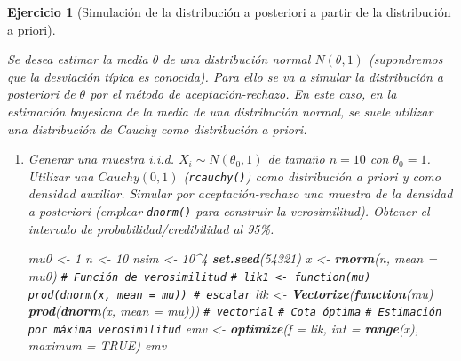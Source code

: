 \documentclass[
  spanish,
  10pt,
]{book}
\newenvironment{Shaded}{\begin{snugshade}}{\end{snugshade}}
\newcommand{\AttributeTok}[1]{\textcolor[rgb]{0.13,0.29,0.53}{#1}}
\newcommand{\CommentTok}[1]{\textcolor[rgb]{0.56,0.35,0.01}{\textit{#1}}}
\newcommand{\ConstantTok}[1]{\textcolor[rgb]{0.56,0.35,0.01}{#1}}
\newcommand{\ControlFlowTok}[1]{\textcolor[rgb]{0.13,0.29,0.53}{\textbf{#1}}}
\newcommand{\DecValTok}[1]{\textcolor[rgb]{0.00,0.00,0.81}{#1}}
\newcommand{\FunctionTok}[1]{\textcolor[rgb]{0.13,0.29,0.53}{\textbf{#1}}}
\newcommand{\NormalTok}[1]{#1}
\newcommand{\OtherTok}[1]{\textcolor[rgb]{0.56,0.35,0.01}{#1}}
\newcommand{\SpecialCharTok}[1]{\textcolor[rgb]{0.81,0.36,0.00}{\textbf{#1}}}
\theoremstyle{break}
\newtheorem{exercise}{Ejercicio}[chapter]
\theoremstyle{nonumberplain}
\renewcommand{\CommentTok}[1]{\textcolor[rgb]{0.41,0.41,0.41}{\texttt{#1}}}
\begin{document}
\begin{exercise}[Simulación de la distribución a posteriori a partir de la distribución a priori]
\protect\hypertarget{exr:post-pri-ar}{}\label{exr:post-pri-ar}

Se desea estimar la media \(\theta\) de una distribución normal \(N(\theta, 1)\) (supondremos que la desviación típica es conocida).
Para ello se va a simular la distribución a posteriori de \(\theta\) por el método de aceptación-rechazo.
En este caso, en la estimación bayesiana de la media de una distribución normal, se suele utilizar una distribución de Cauchy como distribución a priori.

\begin{enumerate}
\def\labelenumi{\alph{enumi})}
\item
  Generar una muestra i.i.d. \(X_{i}\sim N(\theta_{0},1)\) de tamaño
  \(n=10\) con \(\theta_{0}=1\). Utilizar una \(Cauchy(0,1)\)
  (\texttt{rcauchy()}) como distribución a priori y como densidad auxiliar.
  Simular por aceptación-rechazo una muestra de la densidad a
  posteriori (emplear \texttt{dnorm()} para construir la verosimilitud).
  Obtener el intervalo de probabilidad/credibilidad al 95\%.

\begin{Shaded}
\begin{Highlighting}[]
\NormalTok{mu0 }\OtherTok{\textless{}{-}} \DecValTok{1}
\NormalTok{n }\OtherTok{\textless{}{-}} \DecValTok{10}
\NormalTok{nsim }\OtherTok{\textless{}{-}} \DecValTok{10}\SpecialCharTok{\^{}}\DecValTok{4}
\FunctionTok{set.seed}\NormalTok{(}\DecValTok{54321}\NormalTok{)}
\NormalTok{x }\OtherTok{\textless{}{-}} \FunctionTok{rnorm}\NormalTok{(n, }\AttributeTok{mean =}\NormalTok{ mu0)}
\CommentTok{\# Función de verosimilitud}
\CommentTok{\# lik1 \textless{}{-} function(mu) prod(dnorm(x, mean = mu)) \# escalar}
\NormalTok{lik }\OtherTok{\textless{}{-}} \FunctionTok{Vectorize}\NormalTok{(}\ControlFlowTok{function}\NormalTok{(mu) }\FunctionTok{prod}\NormalTok{(}\FunctionTok{dnorm}\NormalTok{(x, }\AttributeTok{mean =}\NormalTok{ mu))) }\CommentTok{\# vectorial}
\CommentTok{\# Cota óptima}
\CommentTok{\# Estimación por máxima verosimilitud}
\NormalTok{emv }\OtherTok{\textless{}{-}} \FunctionTok{optimize}\NormalTok{(}\AttributeTok{f =}\NormalTok{ lik, }\AttributeTok{int =} \FunctionTok{range}\NormalTok{(x), }\AttributeTok{maximum =} \ConstantTok{TRUE}\NormalTok{)}
\NormalTok{emv}
\end{Highlighting}
\end{Shaded}


\end{enumerate}
\end{exercise}
\end{document}

